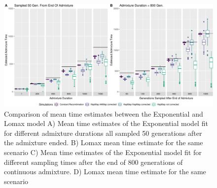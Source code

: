 \documentclass[]{article}
\begin{document}
\begin{figure}
\centering
\includegraphics{Admixture_Time_Inference_Paper_Draft_files/figure-latex/figS3-1.pdf}
\caption{\label{fig:figS2} Comparison of mean time estimates between the Exponential and Lomax model A) Mean time estimates of the Exponential model fit for different 
admixture durations all sampled 50 generations after the admixture ended. B)
Lomax mean time estimate for the same scenario C) Mean time estimates of the Exponential model fit for different sampling times after the end of 800
generations of continuous admixture. D) Lomax mean time estimate for the same scenario}
\end{figure}
\end{document}
